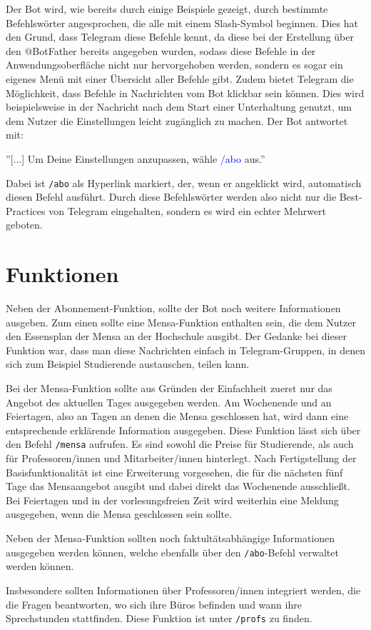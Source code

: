 Der Bot wird, wie bereits durch einige Beispiele gezeigt, durch bestimmte Befehlswörter angesprochen, die alle mit einem Slash-Symbol beginnen. Dies hat den Grund, dass Telegram diese Befehle kennt, da diese bei der Erstellung über den @BotFather bereits angegeben wurden, sodass diese Befehle in der Anwendungsoberfläche nicht nur hervorgehoben werden, sondern es sogar ein eigenes Menü mit einer Übersicht aller Befehle gibt. Zudem bietet Telegram die Möglichkeit, dass Befehle in Nachrichten vom Bot klickbar sein können. Dies wird beispielsweise in der Nachricht nach dem Start einer Unterhaltung genutzt, um dem Nutzer die Einstellungen leicht zugänglich zu machen. Der Bot antwortet mit:

''[...] Um Deine Einstellungen anzupassen, wähle \textcolor{blue}{/abo} aus.''

Dabei ist \texttt{/abo} als Hyperlink markiert, der, wenn er angeklickt wird, automatisch diesen Befehl ausführt. Durch diese Befehlswörter werden also nicht nur die Best-Practices von Telegram eingehalten, sondern es wird ein echter Mehrwert geboten.

\section{Funktionen}
Neben der Abonnement-Funktion, sollte der Bot noch weitere Informationen ausgeben. Zum einen sollte eine Mensa-Funktion enthalten sein, die dem Nutzer den Essensplan der Mensa an der Hochschule ausgibt. Der Gedanke bei dieser Funktion war, dass man diese Nachrichten einfach in Telegram-Gruppen, in denen sich zum Beispiel Studierende austauschen, teilen kann.

Bei der Mensa-Funktion sollte aus Gründen der Einfachheit zuerst nur das Angebot des aktuellen Tages ausgegeben werden. Am Wochenende und an Feiertagen, also an Tagen an denen die Mensa geschlossen hat, wird dann eine entsprechende erklärende Information ausgegeben. Diese Funktion lässt sich über den Befehl \texttt{/mensa} aufrufen. Es sind sowohl die Preise für Studierende, als auch für Professoren/innen und Mitarbeiter/innen hinterlegt.
Nach Fertigstellung der Basisfunktionalität ist eine Erweiterung vorgesehen, die für die nächsten fünf Tage das Mensaangebot ausgibt und dabei direkt das Wochenende ausschließt. Bei Feiertagen und in der vorlesungsfreien Zeit wird weiterhin eine Meldung ausgegeben, wenn die Mensa geschlossen sein sollte.

Neben der Mensa-Funktion sollten noch faktultätsabhängige Informationen ausgegeben werden können, welche ebenfalls über den \texttt{/abo}-Befehl verwaltet werden können.

Insbesondere sollten Informationen über Professoren/innen integriert werden, die die Fragen beantworten, wo sich ihre Büros befinden und wann ihre Sprechstunden stattfinden. Diese Funktion ist unter \texttt{/profs} zu finden.
